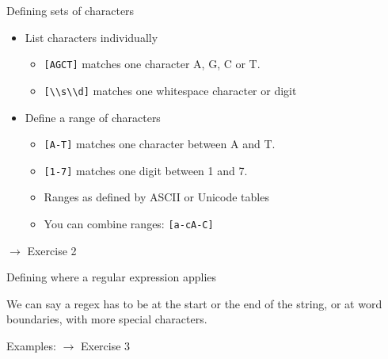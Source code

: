 \documentclass{beamer}
\begin{document}
\begin{frame}{Defining sets of characters}
 \begin{itemize}
  \item List characters individually
    \begin{itemize}
      \item \lstinline$[AGCT]$ matches one character A, G, C or T.
      \item \lstinline$[\\s\\d]$ matches one whitespace character or digit
    \end{itemize}
  \item Define a range of characters
    \begin{itemize}
      \item \lstinline$[A-T]$ matches one character between A and T.
      \item \lstinline$[1-7]$ matches one digit between 1 and 7.
      \item Ranges as defined by ASCII or Unicode tables
      \item You can combine ranges: \lstinline$[a-cA-C]$
    \end{itemize}
 \end{itemize}

 \bigskip
 $\rightarrow$ Exercise 2

\end{frame}

\begin{frame}{Defining where a regular expression applies}

We can say a regex has to be at the start or the end of the string, or at word boundaries,
with more special characters.


Examples: $\rightarrow$ Exercise 3

\end{frame}
\end{document}
